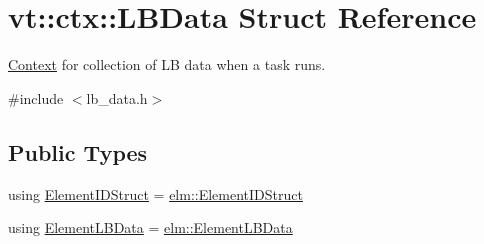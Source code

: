 \hypertarget{structvt_1_1ctx_1_1_l_b_data}{}\section{vt\+:\+:ctx\+:\+:L\+B\+Data Struct Reference}
\label{structvt_1_1ctx_1_1_l_b_data}


\hyperlink{structvt_1_1ctx_1_1_context}{Context} for collection of LB data when a task runs.  




{\ttfamily \#include $<$lb\+\_\+data.\+h$>$}

\subsection*{Public Types}
\begin{DoxyCompactItemize}
\item 
using \hyperlink{structvt_1_1ctx_1_1_l_b_data_aad9fac05c3faf80173b273d900db6fb1}{Element\+I\+D\+Struct} = \hyperlink{structvt_1_1elm_1_1_element_i_d_struct}{elm\+::\+Element\+I\+D\+Struct}
\item 
using \hyperlink{structvt_1_1ctx_1_1_l_b_data_a11f1aeb75c01ae0c77d96f94ce1994bb}{Element\+L\+B\+Data} = \hyperlink{structvt_1_1elm_1_1_element_l_b_data}{elm\+::\+Element\+L\+B\+Data}
\end{DoxyCompactItemize}
